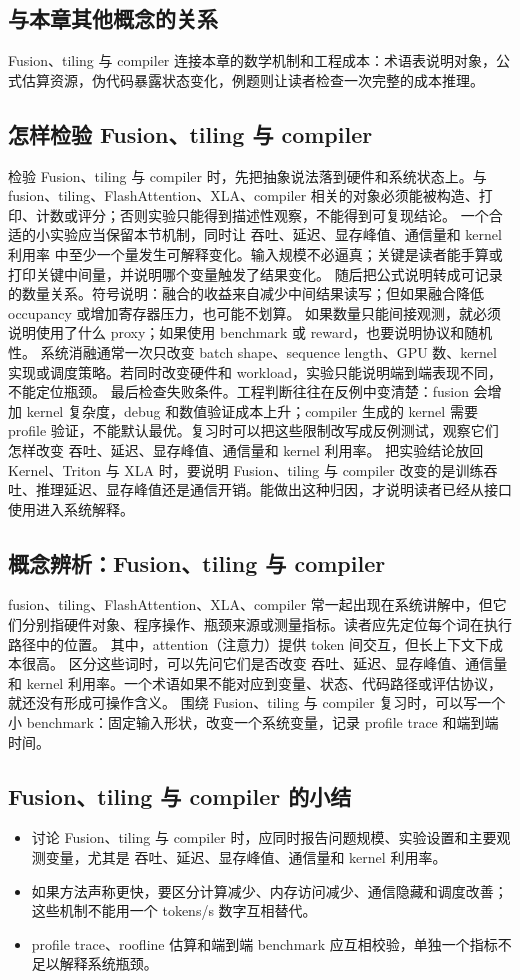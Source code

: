 \documentclass[a4paper]{article}
\begin{document}
\subsection{与本章其他概念的关系}
Fusion、tiling 与 compiler 连接本章的数学机制和工程成本：术语表说明对象，公式估算资源，伪代码暴露状态变化，例题则让读者检查一次完整的成本推理。
\subsection{怎样检验 Fusion、tiling 与 compiler}
检验 Fusion、tiling 与 compiler 时，先把抽象说法落到硬件和系统状态上。与 fusion、tiling、FlashAttention、XLA、compiler 相关的对象必须能被构造、打印、计数或评分；否则实验只能得到描述性观察，不能得到可复现结论。
一个合适的小实验应当保留本节机制，同时让 吞吐、延迟、显存峰值、通信量和 kernel 利用率 中至少一个量发生可解释变化。输入规模不必逼真；关键是读者能手算或打印关键中间量，并说明哪个变量触发了结果变化。
随后把公式说明转成可记录的数量关系。符号说明：融合的收益来自减少中间结果读写；但如果融合降低 occupancy 或增加寄存器压力，也可能不划算。 如果数量只能间接观测，就必须说明使用了什么 proxy；如果使用 benchmark 或 reward，也要说明协议和随机性。
系统消融通常一次只改变 batch shape、sequence length、GPU 数、kernel 实现或调度策略。若同时改变硬件和 workload，实验只能说明端到端表现不同，不能定位瓶颈。
最后检查失败条件。工程判断往往在反例中变清楚：fusion 会增加 kernel 复杂度，debug 和数值验证成本上升；compiler 生成的 kernel 需要 profile 验证，不能默认最优。复习时可以把这些限制改写成反例测试，观察它们怎样改变 吞吐、延迟、显存峰值、通信量和 kernel 利用率。
把实验结论放回 Kernel、Triton 与 XLA 时，要说明 Fusion、tiling 与 compiler 改变的是训练吞吐、推理延迟、显存峰值还是通信开销。能做出这种归因，才说明读者已经从接口使用进入系统解释。
\subsection{概念辨析：Fusion、tiling 与 compiler}
fusion、tiling、FlashAttention、XLA、compiler 常一起出现在系统讲解中，但它们分别指硬件对象、程序操作、瓶颈来源或测量指标。读者应先定位每个词在执行路径中的位置。
其中，attention（注意力）提供 token 间交互，但长上下文下成本很高。
区分这些词时，可以先问它们是否改变 吞吐、延迟、显存峰值、通信量和 kernel 利用率。一个术语如果不能对应到变量、状态、代码路径或评估协议，就还没有形成可操作含义。
围绕 Fusion、tiling 与 compiler 复习时，可以写一个小 benchmark：固定输入形状，改变一个系统变量，记录 profile trace 和端到端时间。
\subsection{Fusion、tiling 与 compiler 的小结}
\begin{itemize}
\item 讨论 Fusion、tiling 与 compiler 时，应同时报告问题规模、实验设置和主要观测变量，尤其是 吞吐、延迟、显存峰值、通信量和 kernel 利用率。
\item 如果方法声称更快，要区分计算减少、内存访问减少、通信隐藏和调度改善；这些机制不能用一个 tokens/s 数字互相替代。
\item profile trace、roofline 估算和端到端 benchmark 应互相校验，单独一个指标不足以解释系统瓶颈。
\end{itemize}
\end{document}
